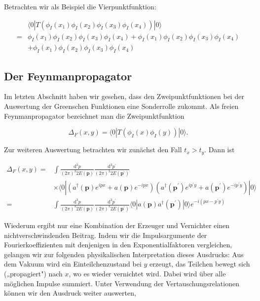 \documentclass[10pt, letterpaper]{article}
\begin{document}
Betrachten wir als Beispiel die Vierpunktfunktion:

$$
\begin{aligned}
& \langle 0| T\left(\phi_{I}\left(x_{1}\right) \phi_{I}\left(x_{2}\right) \phi_{I}\left(x_{3}\right) \phi_{I}\left(x_{4}\right)\right)|0\rangle \\
= & \phi_{I}\left(x_{1}\right) \phi_{I}\left(x_{2}\right) \phi_{I}\left(x_{3}\right) \phi_{I}\left(x_{4}\right)+\phi_{I}\left(x_{1}\right) \phi_{I}\left(x_{2}\right) \phi_{I}\left(x_{3}\right) \phi_{I}\left(x_{4}\right) \\
& +\phi_{I}\left(x_{1}\right) \phi_{I}\left(x_{2}\right) \phi_{I}\left(x_{3}\right) \phi_{I}\left(x_{4}\right)
\end{aligned}
$$

\subsection*{Der Feynmanpropagator}
Im letzten Abschnitt haben wir gesehen, dass den Zweipunktfunktionen bei der Auswertung der Greenschen Funktionen eine Sonderrolle zukommt. Als freien Feynmanpropagator bezeichnet man die Zweipunktfunktion

$$
\Delta_{F}(x, y)=\langle 0| T\left(\phi_{I}(x) \phi_{I}(y)\right)|0\rangle .
$$

Zur weiteren Auswertung betrachten wir zunächst den Fall $t_{x}>t_{y}$. Dann ist

$$
\begin{aligned}
\Delta_{F}(x, y)= & \int \frac{\mathrm{d}^{3} p}{(2 \pi)^{3} 2 E(\mathbf{p})} \frac{\mathrm{d}^{3} p^{\prime}}{(2 \pi)^{3} 2 E\left(\mathbf{p}^{\prime}\right)} \\
& \times\langle 0|\left(a^{\dagger}(\mathbf{p}) e^{i p x}+a(\mathbf{p}) e^{-i p x}\right)\left(a^{\dagger}\left(\mathbf{p}^{\prime}\right) e^{i p^{\prime} y}+a\left(\mathbf{p}^{\prime}\right) e^{-i p^{\prime} y}\right)|0\rangle \\
= & \int \frac{\mathrm{d}^{3} p}{(2 \pi)^{3} 2 E(\mathbf{p})} \frac{\mathrm{d}^{3} p^{\prime}}{(2 \pi)^{3} 2 E\left(\mathbf{p}^{\prime}\right)}\langle 0| a(\mathbf{p}) a^{\dagger}\left(\mathbf{p}^{\prime}\right)|0\rangle e^{-i\left(p x-p^{\prime} y\right)}
\end{aligned}
$$

Wiederum ergibt nur eine Kombination der Erzeuger und Vernichter einen nichtverschwindenden Beitrag. Indem wir die Impulsargumente der Fourierkoeffizienten mit denjenigen in den Exponentialfaktoren vergleichen, gelangen wir zur folgenden physikalischen Interpretation dieses Ausdrucks: Aus dem Vakuum wird ein Einteilchenzustand bei $y$ erzeugt, das Teilchen bewegt sich („propagiert") nach $x$, wo es wieder vernichtet wird. Dabei wird über alle möglichen Impulse summiert. Unter Verwendung der Vertauschungsrelationen können wir den Ausdruck weiter auswerten,
\end{document}
